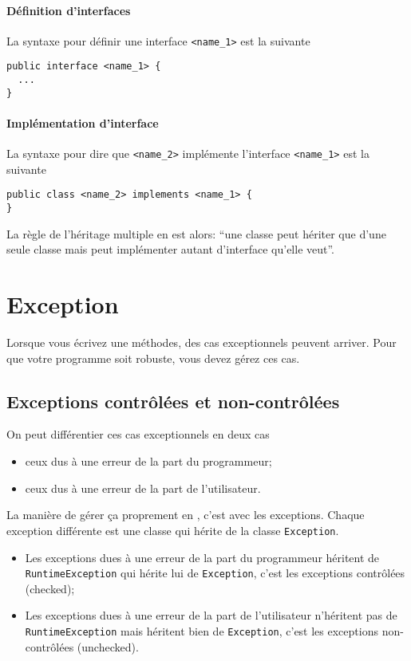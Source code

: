 \paragraph{Définition d'interfaces}
La syntaxe pour définir une interface \lstinline|<name_1>| est la suivante
\begin{lstlisting}
public interface <name_1> {
  ...
}
\end{lstlisting}

\paragraph{Implémentation d'interface} %
La syntaxe pour dire que \lstinline|<name_2>|
implémente l'interface \lstinline|<name_1>| est la suivante
\begin{lstlisting}
public class <name_2> implements <name_1> {
}
\end{lstlisting}

La règle de l'héritage multiple en \java{} est alors:
``une classe peut hériter que d'une seule classe mais peut implémenter
autant d'interface qu'elle veut''.

\section{Exception}
Lorsque vous écrivez une méthodes,
des cas exceptionnels peuvent arriver.
Pour que votre programme soit robuste,
vous devez gérez ces cas.

\subsection{Exceptions contrôlées et non-contrôlées}
On peut différentier ces cas exceptionnels en deux cas
\begin{itemize}
  \item ceux dus à une erreur de la part du programmeur;
  \item ceux dus à une erreur de la part de l'utilisateur.
\end{itemize}

La manière de gérer ça proprement en \java{},
c'est avec les exceptions.
Chaque exception différente est une classe qui hérite de la classe
\lstinline{Exception}.

\begin{itemize}
  \item
    Les exceptions dues à une erreur de la part du programmeur héritent
    de \lstinline{RuntimeException} qui hérite lui de \lstinline{Exception},
    c'est les exceptions contrôlées (checked);
  \item
    Les exceptions dues à une erreur de la part de l'utilisateur n'héritent
    pas de \lstinline{RuntimeException} mais héritent bien de
    \lstinline{Exception}, c'est les exceptions non-contrôlées (unchecked).
\end{itemize}

